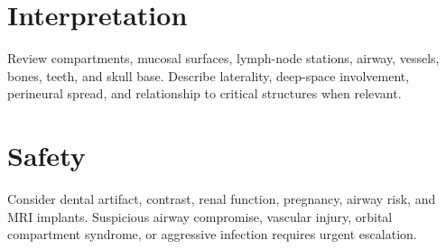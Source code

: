 \section{Interpretation}
Review compartments, mucosal surfaces, lymph-node stations, airway, vessels, bones, teeth, and skull base. Describe laterality, deep-space involvement, perineural spread, and relationship to critical structures when relevant.

\section{Safety}
Consider dental artifact, contrast, renal function, pregnancy, airway risk, and MRI implants. Suspicious airway compromise, vascular injury, orbital compartment syndrome, or aggressive infection requires urgent escalation.

\clearpage
